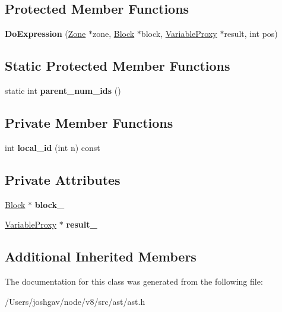 \subsection*{Protected Member Functions}
\begin{DoxyCompactItemize}
\item 
{\bfseries Do\+Expression} (\hyperlink{classv8_1_1internal_1_1_zone}{Zone} $\ast$zone, \hyperlink{classv8_1_1internal_1_1_block}{Block} $\ast$block, \hyperlink{classv8_1_1internal_1_1_variable_proxy}{Variable\+Proxy} $\ast$result, int pos)\hypertarget{classv8_1_1internal_1_1_do_expression_a803cdf8a93901d9a2ea2290142c87e91}{}\label{classv8_1_1internal_1_1_do_expression_a803cdf8a93901d9a2ea2290142c87e91}

\end{DoxyCompactItemize}
\subsection*{Static Protected Member Functions}
\begin{DoxyCompactItemize}
\item 
static int {\bfseries parent\+\_\+num\+\_\+ids} ()\hypertarget{classv8_1_1internal_1_1_do_expression_a66d8c6482f135f0a821ae13b57582d11}{}\label{classv8_1_1internal_1_1_do_expression_a66d8c6482f135f0a821ae13b57582d11}

\end{DoxyCompactItemize}
\subsection*{Private Member Functions}
\begin{DoxyCompactItemize}
\item 
int {\bfseries local\+\_\+id} (int n) const \hypertarget{classv8_1_1internal_1_1_do_expression_a9c67b28b27948fc66aa8c00d1ee8fbf7}{}\label{classv8_1_1internal_1_1_do_expression_a9c67b28b27948fc66aa8c00d1ee8fbf7}

\end{DoxyCompactItemize}
\subsection*{Private Attributes}
\begin{DoxyCompactItemize}
\item 
\hyperlink{classv8_1_1internal_1_1_block}{Block} $\ast$ {\bfseries block\+\_\+}\hypertarget{classv8_1_1internal_1_1_do_expression_a40e186be6f927bb94f175b1c9fa244ac}{}\label{classv8_1_1internal_1_1_do_expression_a40e186be6f927bb94f175b1c9fa244ac}

\item 
\hyperlink{classv8_1_1internal_1_1_variable_proxy}{Variable\+Proxy} $\ast$ {\bfseries result\+\_\+}\hypertarget{classv8_1_1internal_1_1_do_expression_ae44c376090de8760ce10c31904e33a0e}{}\label{classv8_1_1internal_1_1_do_expression_ae44c376090de8760ce10c31904e33a0e}

\end{DoxyCompactItemize}
\subsection*{Additional Inherited Members}


The documentation for this class was generated from the following file\+:\begin{DoxyCompactItemize}
\item 
/\+Users/joshgav/node/v8/src/ast/ast.\+h\end{DoxyCompactItemize}
